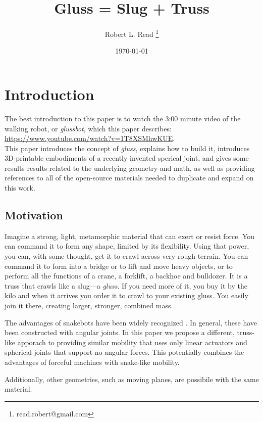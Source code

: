 \documentclass[11pt]{article}
\title{Gluss = Slug + Truss}
\author{Robert L. Read
  \thanks{read.robert@gmail.com}
}
\affil{Founder, Public Invention, an educational non-profit.}
\date{\today}
\begin{document}
\maketitle


\section{Introduction}

The best introduction to this paper is to watch the 3:00 minute video of the
walking robot, or \emph{glussbot}, which this paper describes:\\
\indent \href{https://www.youtube.com/watch?v=1T8XSMhwKUE}{https://www.youtube.com/watch?v=1T8XSMhwKUE}.\\
This paper introduces the concept of \emph{gluss}, explains how to build it,
introduces 3D-printable embodiments of
a recently invented sperical joint, 
and gives some results results related to the underlying geometry and math, as well as providing
references to all of the open-source materials needed to duplicate and expand on this work.

\subsection{Motivation}

Imagine a strong, light, metamorphic material that can exert or resist force.
You can command it to form any shape, limited by its flexibility.
Using that power, you can, with some thought, get it to crawl across very rough terrain.
You can command it to form into a bridge or to lift and move heavy objects,
or to perform all the functions of a crane, a forklift, a backhoe and bulldozer.
It is a truss that crawls like a slug---a \emph{gluss}.
If you need more of it, you buy it by the kilo and when it arrives you order it
to crawl to your existing gluss. You easily join it there, creating 
larger, stronger, combined mass.

The advantages of snakebots have been widely recognized \cite{liljebäck2012snake}. In general, these have been constructed
with angular joints. In this paper we propose a different, truss-like apporach to providing similar
mobility that uses only linear actuators and spherical joints that support no angular forces. This
potentially combines the advantages of forceful machines with snake-like mobility.

Additionally, other geometries, such as moving planes, are possibile with the same material.
\end{document}
